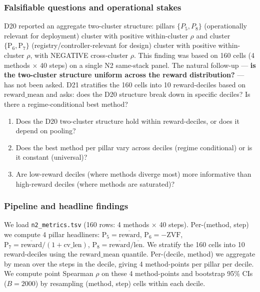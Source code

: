 
\subsubsection{Falsifiable questions and operational stakes}\label{sec:synth-d21-questions}
D20 reported an aggregate two-cluster structure: pillars $\{P_5, P_8\}$
(operationally relevant for deployment) cluster with positive
within-cluster $\rho$ and cluster $\{\mathrm{P}_6, \mathrm{P}_7\}$
(registry/controller-relevant for design) cluster with positive
within-cluster $\rho$, with NEGATIVE cross-cluster $\rho$. This finding
was based on 160 cells (4 methods $\times$ 40 steps) on a single N2
same-stack panel. The natural follow-up --- \textbf{is the two-cluster
structure uniform across the reward distribution?} --- has not been
asked. D21 stratifies the 160 cells into 10 reward-deciles based on
$\mathrm{reward\_mean}$ and asks: does the D20 structure break down in
specific deciles? Is there a regime-conditional best method?

\begin{enumerate}
\item Does the D20 two-cluster structure hold within reward-deciles,
  or does it depend on pooling?
\item Does the best method per pillar vary across deciles (regime
  conditional) or is it constant (universal)?
\item Are low-reward deciles (where methods diverge most) more
  informative than high-reward deciles (where methods are saturated)?
\end{enumerate}

\subsubsection{Pipeline and headline findings}\label{sec:synth-d21-pipeline}
We load \texttt{n2\_metrics.tsv} (160 rows: 4 methods $\times$ 40 steps).
Per-(method, step) we compute 4 pillar headliners:
$\mathrm{P}_5 = \overline{\mathrm{reward}}$,
$\mathrm{P}_6 = -\mathrm{ZVF}$,
$\mathrm{P}_7 = \overline{\mathrm{reward}} / (1 + \mathrm{cv\_len})$,
$\mathrm{P}_8 = \overline{\mathrm{reward}} / \overline{\mathrm{len}}$.
We stratify the 160 cells into 10 reward-deciles using the
$\mathrm{reward\_mean}$ quantile. Per-(decile, method) we aggregate by
mean over the steps in the decile, giving 4 method-points per pillar per
decile. We compute point Spearman $\rho$ on these 4 method-points and
bootstrap 95\% CIs ($B{=}2000$) by resampling (method, step) cells within
each decile.

